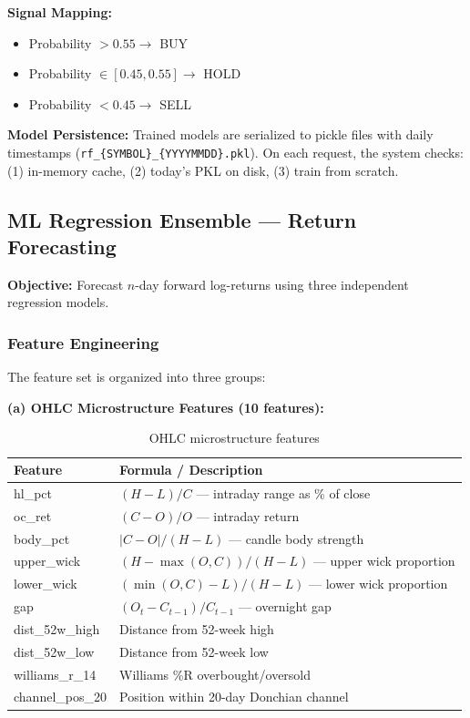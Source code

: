 \documentclass[12pt, a4paper, oneside]{report}
\begin{document}
\textbf{Signal Mapping:}
\begin{itemize}[nosep]
    \item Probability $> 0.55 \to$ BUY
    \item Probability $\in [0.45, 0.55] \to$ HOLD
    \item Probability $< 0.45 \to$ SELL
\end{itemize}

\textbf{Model Persistence:} Trained models are serialized to pickle files with daily timestamps (\texttt{rf\_\{SYMBOL\}\_\{YYYYMMDD\}.pkl}). On each request, the system checks: (1) in-memory cache, (2) today's PKL on disk, (3) train from scratch.

\subsection{ML Regression Ensemble --- Return Forecasting}

\textbf{Objective:} Forecast $n$-day forward log-returns using three independent regression models.

\subsubsection{Feature Engineering}

The feature set is organized into three groups:

\textbf{(a) OHLC Microstructure Features (10 features):}
\begin{table}[H]
\centering
\caption{OHLC microstructure features}
\label{tab:ohlc_features}
\begin{tabular}{@{}ll@{}}
\toprule
\textbf{Feature} & \textbf{Formula / Description} \\
\midrule
hl\_pct & $(H - L) / C$ --- intraday range as \% of close \\
oc\_ret & $(C - O) / O$ --- intraday return \\
body\_pct & $|C - O| / (H - L)$ --- candle body strength \\
upper\_wick & $(H - \max(O,C)) / (H - L)$ --- upper wick proportion \\
lower\_wick & $(\min(O,C) - L) / (H - L)$ --- lower wick proportion \\
gap & $(O_t - C_{t-1}) / C_{t-1}$ --- overnight gap \\
dist\_52w\_high & Distance from 52-week high \\
dist\_52w\_low & Distance from 52-week low \\
williams\_r\_14 & Williams \%R overbought/oversold \\
channel\_pos\_20 & Position within 20-day Donchian channel \\
\bottomrule
\end{tabular}
\end{table}
\end{document}

